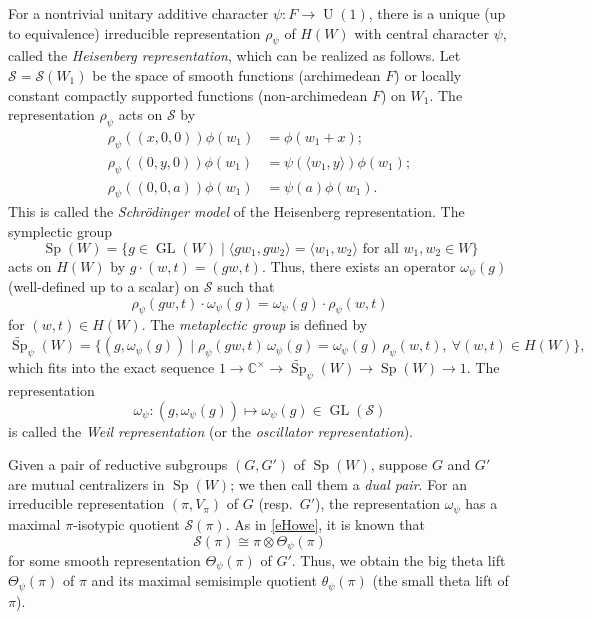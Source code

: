 \documentclass[11pt]{article}
\theoremstyle{plain}
\theoremstyle{remark}
\theoremstyle{definition}
\DeclareMathOperator{\GL}{GL}
\DeclareMathOperator{\U}{U}
\DeclareMathOperator{\Sp}{Sp}
\begin{document}
For a nontrivial unitary additive character $\psi\colon F\to \U(1)$, there is a unique (up to equivalence) irreducible representation $\rho_{\psi}$ of $H(W)$ with central character $\psi$, called the \emph{Heisenberg representation}, which can be realized as follows.
Let $\mathcal{S}=\mathcal{S}(W_1)$ be the space of smooth functions (archimedean $F$) or locally constant compactly supported functions (non-archimedean $F$) on $W_1$.
The representation $\rho_{\psi}$ acts on $\mathcal{S}$ by
\begin{equation*}
\begin{aligned}
\rho_{\psi}((x,0,0))\phi(w_1)&=\phi(w_1+x);\\
\rho_{\psi}((0,y,0))\phi(w_1)&=\psi(\langle w_1,y\rangle)\phi(w_1);\\
\rho_{\psi}((0,0,a))\phi(w_1)&=\psi(a)\phi(w_1).
\end{aligned}
\end{equation*}
This is called the \emph{Schr\"odinger model} of the Heisenberg representation. 
The symplectic group
\[
\Sp(W)=\{g\in \GL(W)\mid \langle gw_1,gw_2\rangle=\langle w_1,w_2\rangle \text{ for all } w_1,w_2\in W\}
\]
acts on $H(W)$ by $g\cdot (w,t)=(gw,t)$.
Thus, there exists an operator $\omega_{\psi}(g)$ (well-defined up to a scalar) on $\mathcal{S}$ such that
\begin{equation}\label{emetagrp}
\rho_{\psi}(gw,t)\cdot \omega_{\psi}(g)=\omega_{\psi}(g)\cdot \rho_{\psi}(w,t)
\end{equation}
for $(w,t)\in H(W)$.
The \emph{metaplectic group} is defined by
\[
\widetilde{\Sp}_{\psi}(W)=\{(g,\omega_{\psi}(g))\mid \rho_{\psi}(gw,t)\,\omega_{\psi}(g)=\omega_{\psi}(g)\,\rho_{\psi}(w,t),\ \forall (w,t)\in H(W)\},
\]
which fits into the exact sequence $1\to \mathbb{C}^{\times}\to \widetilde{\Sp}_{\psi}(W)\to \Sp(W)\to 1$.
The representation
\[
\omega_{\psi}\colon (g,\omega_{\psi}(g))\mapsto \omega_{\psi}(g)\in \GL(\mathcal{S})
\]
is called the \emph{Weil representation} (or the \emph{oscillator representation}).

Given a pair of reductive subgroups $(G,G')$ of $\Sp(W)$, suppose $G$ and $G'$ are mutual centralizers in $\Sp(W)$; we then call them a \emph{dual pair}.
For an irreducible representation $(\pi,V_{\pi})$ of $G$ (resp.\ $G'$), the representation $\omega_{\psi}$ has a maximal $\pi$-isotypic quotient $\mathcal{S}(\pi)$.
As in \eqref{eHowe}, it is known that
\begin{equation}\label{eThetaQuoLocal}
\mathcal{S}(\pi)\cong \pi\otimes \Theta_{\psi}(\pi)
\end{equation}
for some smooth representation $\Theta_{\psi}(\pi)$ of $G'$.
Thus, we obtain the big theta lift $\Theta_{\psi}(\pi)$ of $\pi$ and its maximal semisimple quotient $\theta_{\psi}(\pi)$ (the small theta lift of $\pi$).
\end{document}
